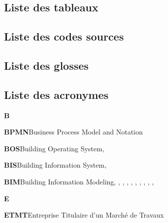\documentclass[a4paper,12pt]{article}
\begin{document}
\subsection{Liste des tableaux}
\label{sec:orgaf488bf}
\renewcommand{\listtablename}{\vspace{-2em}}
\listoftables
\subsection{Liste des codes sources}
\label{sec:org645d339}
\renewcommand{\lstlistingname}{\vspace{-2em}}
\lstlistoflistings
\subsection{Liste des glosses}
\label{sec:org669c655}
\begin{multicols}{2}\small{

}\end{multicols}
\subsection{Liste des acronymes}
\label{sec:org1287467}

\textbf{B}

\textbf{\hypertarget{gls-78}{BPMN}}\hspace*{1em}Business Process Model and Notation\hspace*{.5em}\pageref{gls-20-use-1}

\textbf{\hypertarget{gls-73}{BOS}}\hspace*{1em}Building Operating System\hspace*{.5em}\pageref{gls-6-use-1}, \pageref{gls-6-use-2}

\textbf{\hypertarget{gls-70}{BIS}}\hspace*{1em}Building Information System\hspace*{.5em}\pageref{gls-5-use-1}, \pageref{gls-5-use-2}

\textbf{\hypertarget{gls-69}{BIM}}\hspace*{1em}Building Information Modeling\hspace*{.5em}\pageref{gls-1-use-1}, \pageref{gls-1-use-2}, \pageref{gls-1-use-3}, \pageref{gls-1-use-4}, \pageref{gls-1-use-5}, \pageref{gls-1-use-6}, \pageref{gls-1-use-7}, \pageref{gls-1-use-8}, \pageref{gls-1-use-9}, \pageref{gls-1-use-10}, \pageref{gls-1-use-11}

\textbf{E}

\textbf{\hypertarget{gls-151}{ETMT}}\hspace*{1em}Entreprise Titulaire d'un Marché de Travaux\hspace*{.5em}\pageref{gls-11-use-1}
\end{document}
